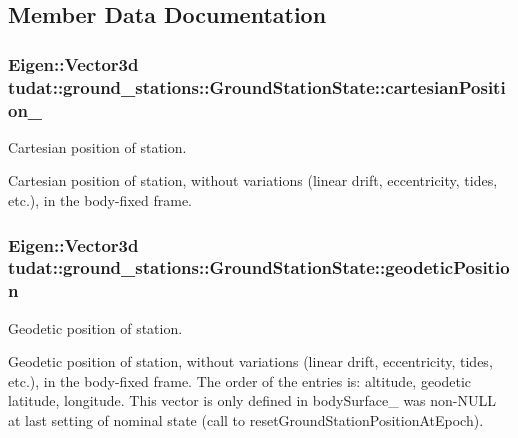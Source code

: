 \subsection{Member Data Documentation}
\subsubsection[{\texorpdfstring{cartesian\+Position\+\_\+}{cartesianPosition_}}]{\setlength{\rightskip}{0pt plus 5cm}Eigen\+::\+Vector3d tudat\+::ground\+\_\+stations\+::\+Ground\+Station\+State\+::cartesian\+Position\+\_\+\hspace{0.3cm}{\ttfamily [protected]}}\hypertarget{classtudat_1_1ground__stations_1_1GroundStationState_acc4e35ba9f9a797f000eb848982706ba}{}\label{classtudat_1_1ground__stations_1_1GroundStationState_acc4e35ba9f9a797f000eb848982706ba}


Cartesian position of station. 

Cartesian position of station, without variations (linear drift, eccentricity, tides, etc.), in the body-\/fixed frame. 
\subsubsection[{\texorpdfstring{geodetic\+Position}{geodeticPosition}}]{\setlength{\rightskip}{0pt plus 5cm}Eigen\+::\+Vector3d tudat\+::ground\+\_\+stations\+::\+Ground\+Station\+State\+::geodetic\+Position\hspace{0.3cm}{\ttfamily [protected]}}\hypertarget{classtudat_1_1ground__stations_1_1GroundStationState_a2af20fd123b1e5ca703c4ee7c9b25bc8}{}\label{classtudat_1_1ground__stations_1_1GroundStationState_a2af20fd123b1e5ca703c4ee7c9b25bc8}


Geodetic position of station. 

Geodetic position of station, without variations (linear drift, eccentricity, tides, etc.), in the body-\/fixed frame. The order of the entries is\+: altitude, geodetic latitude, longitude. This vector is only defined in body\+Surface\+\_\+ was non-\/\+N\+U\+LL at last setting of nominal state (call to reset\+Ground\+Station\+Position\+At\+Epoch). 
